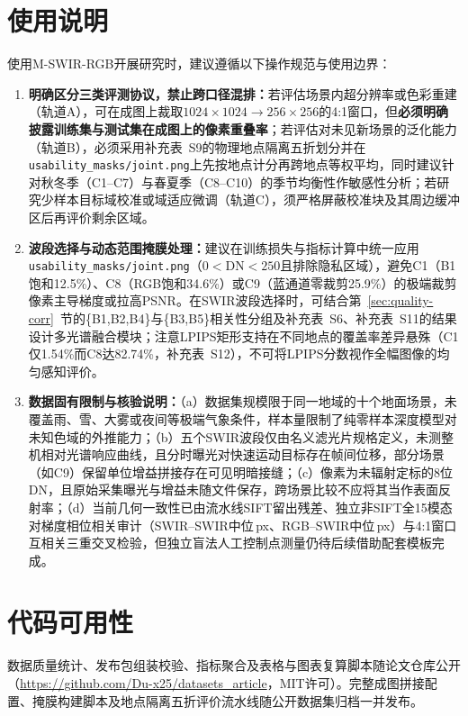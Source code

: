 \documentclass[UTF8,a4paper,10pt]{ctexart}
\begin{document}
\section{使用说明}\label{sec:usage}
使用M-SWIR-RGB开展研究时，建议遵循以下操作规范与使用边界：
\begin{enumerate}
\item \textbf{明确区分三类评测协议，禁止跨口径混排：}若评估场景内超分辨率或色彩重建（轨道A），可在成图上裁取$1024\times1024\to256\times256$的4:1窗口，但\textbf{必须明确披露训练集与测试集在成图上的像素重叠率}；若评估对未见新场景的泛化能力（轨道B），必须采用补充表~S9的物理地点隔离五折划分并在\texttt{usability\_masks/joint.png}上先按地点计分再跨地点等权平均，同时建议针对秋冬季（C1--C7）与春夏季（C8--C10）的季节均衡性作敏感性分析；若研究少样本目标域校准或域适应微调（轨道C），须严格屏蔽校准块及其周边缓冲区后再评价剩余区域。
\item \textbf{波段选择与动态范围掩膜处理：}建议在训练损失与指标计算中统一应用\texttt{usability\_masks/joint.png}（$0<\mathrm{DN}<250$且排除隐私区域），避免C1（B1饱和12.5\%）、C8（RGB饱和34.6\%）或C9（蓝通道零裁剪25.9\%）的极端裁剪像素主导梯度或拉高PSNR。在SWIR波段选择时，可结合第~\ref{sec:quality-corr}~节的\{B1,B2,B4\}与\{B3,B5\}相关性分组及补充表~S6、补充表~S11的结果设计多光谱融合模块；注意LPIPS矩形支持在不同地点的覆盖率差异悬殊（C1仅1.54\%而C8达82.74\%，补充表~S12），不可将LPIPS分数视作全幅图像的均匀感知评价。
\item \textbf{数据固有限制与核验说明：}（a）数据集规模限于同一地域的十个地面场景，未覆盖雨、雪、大雾或夜间等极端气象条件，样本量限制了纯零样本深度模型对未知色域的外推能力；（b）五个SWIR波段仅由名义滤光片规格定义，未测整机相对光谱响应曲线，且分时曝光对快速运动目标存在帧间位移，部分场景（如C9）保留单位增益拼接存在可见明暗接缝；（c）像素为未辐射定标的8位DN，且原始采集曝光与增益未随文件保存，跨场景比较不应将其当作表面反射率；（d）当前几何一致性已由流水线SIFT留出残差、独立非SIFT全15模态对梯度相位相关审计（SWIR--SWIR中位\AuditSwirSwirMed\,px、RGB--SWIR中位\AuditRgbSwirMed\,px）与4:1窗口互相关三重交叉检验，但独立盲法人工控制点测量仍待后续借助配套模板完成。
\end{enumerate}

\section*{代码可用性}
数据质量统计、发布包组装校验、指标聚合及表格与图表复算脚本随论文仓库公开（\url{https://github.com/Du-x25/datasets_article}，MIT许可）。完整成图拼接配置、掩膜构建脚本及地点隔离五折评价流水线随公开数据集归档一并发布。
\end{document}
